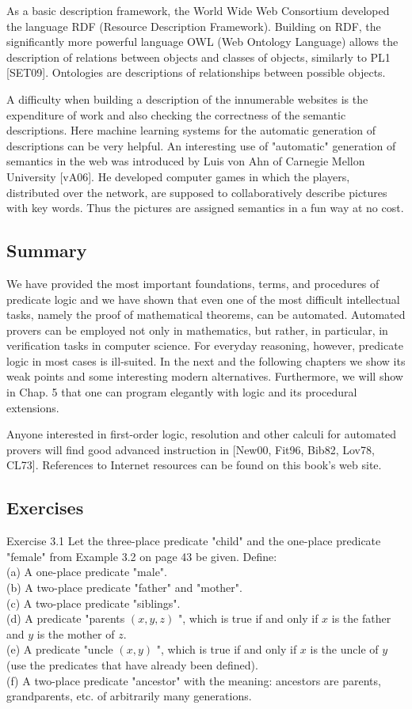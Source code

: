 \documentclass[10pt]{article}
\begin{document}
As a basic description framework, the World Wide Web Consortium developed the language RDF (Resource Description Framework). Building on RDF, the significantly more powerful language OWL (Web Ontology Language) allows the description of relations between objects and classes of objects, similarly to PL1 [SET09]. Ontologies are descriptions of relationships between possible objects.

A difficulty when building a description of the innumerable websites is the expenditure of work and also checking the correctness of the semantic descriptions. Here machine learning systems for the automatic generation of descriptions can be very helpful. An interesting use of "automatic" generation of semantics in the web was introduced by Luis von Ahn of Carnegie Mellon University [vA06]. He developed computer games in which the players, distributed over the network, are supposed to collaboratively describe pictures with key words. Thus the pictures are assigned semantics in a fun way at no cost.

\subsection*{Summary}
We have provided the most important foundations, terms, and procedures of predicate logic and we have shown that even one of the most difficult intellectual tasks, namely the proof of mathematical theorems, can be automated. Automated provers can be employed not only in mathematics, but rather, in particular, in verification tasks in computer science. For everyday reasoning, however, predicate logic in most cases is ill-suited. In the next and the following chapters we show its weak points and some interesting modern alternatives. Furthermore, we will show in Chap. 5 that one can program elegantly with logic and its procedural extensions.

Anyone interested in first-order logic, resolution and other calculi for automated provers will find good advanced instruction in [New00, Fit96, Bib82, Lov78, CL73]. References to Internet resources can be found on this book's web site.

\subsection*{Exercises}
Exercise 3.1 Let the three-place predicate "child" and the one-place predicate "female" from Example 3.2 on page 43 be given. Define:\\
(a) A one-place predicate "male".\\
(b) A two-place predicate "father" and "mother".\\
(c) A two-place predicate "siblings".\\
(d) A predicate "parents $(x, y, z)$ ", which is true if and only if $x$ is the father and $y$ is the mother of $z$.\\
(e) A predicate "uncle $(x, y)$ ", which is true if and only if $x$ is the uncle of $y$ (use the predicates that have already been defined).\\
(f) A two-place predicate "ancestor" with the meaning: ancestors are parents, grandparents, etc. of arbitrarily many generations.
\end{document}
